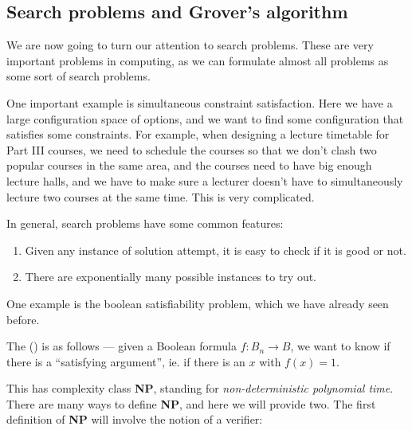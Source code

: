 \documentclass[a4paper]{article}
\begin{document}
\subsection{Search problems and Grover's algorithm}
We are now going to turn our attention to search problems. These are very important problems in computing, as we can formulate almost all problems as some sort of search problems.

One important example is simultaneous constraint satisfaction. Here we have a large configuration space of options, and we want to find some configuration that satisfies some constraints. For example, when designing a lecture timetable for Part III courses, we need to schedule the courses so that we don't clash two popular courses in the same area, and the courses need to have big enough lecture halls, and we have to make sure a lecturer doesn't have to simultaneously lecture two courses at the same time. This is very complicated.

In general, search problems have some common features:
\begin{enumerate}
  \item Given any instance of solution attempt, it is easy to check if it is good or not.
  \item There are exponentially many possible instances to try out.
\end{enumerate}

One example is the boolean satisfiability problem, which we have already seen before.
\begin{eg}
  The  () is as follows --- given a Boolean formula $f: B_n \to B$, we want to know if there is a ``satisfying argument'', ie. if there is an $x$ with $f(x) = 1$.
\end{eg}

This has complexity class \textbf{NP}, standing for \emph{non-deterministic polynomial time}. There are many ways to define \textbf{NP}, and here we will provide two. The first definition of \textbf{NP} will involve the notion of a verifier:
\end{document}
